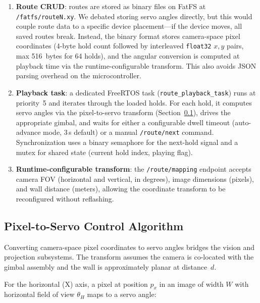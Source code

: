 \documentclass[12pt]{article}
\begin{document}
\begin{enumerate}
  \item \textbf{Route CRUD}: routes are stored as binary files on FatFS at
        \texttt{/fatfs/routeN.xy}.  We debated storing servo angles directly,
        but this would couple route data to a specific device placement---if
        the device moves, all saved routes break.  Instead, the binary format
        stores camera-space pixel coordinates (4-byte hold count followed by
        interleaved \texttt{float32} $x, y$ pairs, max 516~bytes for 64
        holds), and the angular conversion is computed at playback time via
        the runtime-configurable transform.  This also avoids JSON parsing
        overhead on the microcontroller.

  \item \textbf{Playback task}: a dedicated FreeRTOS task
        (\texttt{route\_playback\_task}) runs at priority~5 and iterates
        through the loaded holds.  For each hold, it computes servo angles via
        the pixel-to-servo transform (Section~\ref{sec:control}), drives the
        appropriate gimbal, and waits for either a configurable dwell timeout
        (auto-advance mode, 3\,s default) or a manual \texttt{/route/next}
        command.  Synchronization uses a binary semaphore for the next-hold
        signal and a mutex for shared state (current hold index, playing flag).

  \item \textbf{Runtime-configurable transform}: the \texttt{/route/mapping}
        endpoint accepts camera FOV (horizontal and vertical, in degrees),
        image dimensions (pixels), and wall distance (meters), allowing the
        coordinate transform to be reconfigured without reflashing.
\end{enumerate}

\subsection{Pixel-to-Servo Control Algorithm}
\label{sec:control}

Converting camera-space pixel coordinates to servo angles bridges the vision
and projection subsystems.  The transform assumes the camera is co-located
with the gimbal assembly and the wall is approximately planar at distance~$d$.

For the horizontal (X) axis, a pixel at position $p_x$ in an image of width
$W$ with horizontal field of view $\theta_H$ maps to a servo angle:
\end{document}
